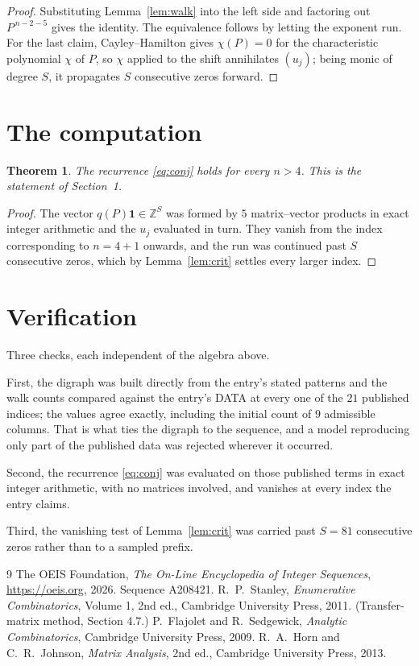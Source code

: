 \documentclass[11pt,a4paper]{article}
\theoremstyle{plain}
\newtheorem{theorem}{Theorem}
\theoremstyle{definition}
\begin{document}
\begin{proof}
Substituting Lemma~\ref{lem:walk} into the left side and factoring out
$P^{\,n-2-5}$ gives the identity. The equivalence follows by letting the exponent
run. For the last claim, Cayley--Hamilton gives $\chi(P)=0$ for the characteristic
polynomial $\chi$ of $P$, so $\chi$ applied to the shift annihilates $(u_j)$; being monic of
degree $S$, it propagates $S$ consecutive zeros forward.
\end{proof}

\section{The computation}

\begin{theorem}
The recurrence \eqref{eq:conj} holds for every $n>4$. This is the statement of
Section~1.
\end{theorem}

\begin{proof}
The vector $q(P)\mathbf{1}\in\mathbb{Z}^{S}$ was formed by $5$ matrix--vector
products in exact integer arithmetic and the $u_j$ evaluated in turn. They vanish from the
index corresponding to $n=4+1$ onwards, and the run was continued past $S$ consecutive
zeros, which by Lemma~\ref{lem:crit} settles every larger index.
\end{proof}

\section{Verification}

Three checks, each independent of the algebra above.

First, the digraph was built directly from the entry's stated patterns and the walk counts
compared against the entry's DATA at every one of the $21$ published indices; the
values agree exactly, including the initial count of $9$ admissible columns. That is
what ties the digraph to the sequence, and a model reproducing only part of the published
data was rejected wherever it occurred.

Second, the recurrence \eqref{eq:conj} was evaluated on those published terms in exact
integer arithmetic, with no matrices involved, and vanishes at every index the entry claims.

Third, the vanishing test of Lemma~\ref{lem:crit} was carried past $S=81$ consecutive
zeros rather than to a sampled prefix.

\begin{thebibliography}{9}
 The OEIS Foundation, \emph{The On-Line Encyclopedia of Integer
Sequences}, \url{https://oeis.org}, 2026. Sequence A208421.
 R.~P.~Stanley, \emph{Enumerative Combinatorics}, Volume 1, 2nd ed.,
Cambridge University Press, 2011. (Transfer-matrix method, Section 4.7.)
 P.~Flajolet and R.~Sedgewick, \emph{Analytic Combinatorics}, Cambridge
University Press, 2009.
 R.~A.~Horn and C.~R.~Johnson, \emph{Matrix Analysis}, 2nd ed., Cambridge
University Press, 2013.
\end{thebibliography}
\end{document}
